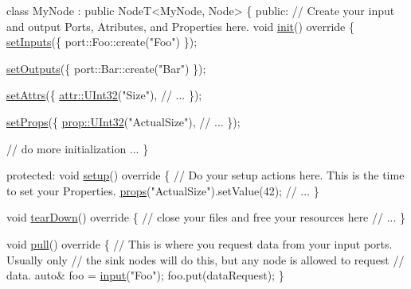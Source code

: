 \begin{DoxyCode}
\textcolor{keyword}{class }MyNode : \textcolor{keyword}{public} NodeT<MyNode, Node>
\{
\textcolor{keyword}{public}:
    \textcolor{comment}{// Create your input and output Ports, Atributes, and Properties here.}
    \textcolor{keywordtype}{void} \hyperlink{classdg_1_1deepcore_1_1_object_a0982aef61087daaf910acfe8b6dcac99}{init}()\textcolor{keyword}{ override}
\textcolor{keyword}{    }\{
        \hyperlink{classdg_1_1deepcore_1_1_node_a23edc019ecfa40357fddf55861ec2092}{setInputs}(\{
            port::Foo::create(\textcolor{stringliteral}{"Foo"})
        \});

        \hyperlink{classdg_1_1deepcore_1_1_node_aac67a930b471ada2d1038965a59f17f3}{setOutputs}(\{
            port::Bar::create(\textcolor{stringliteral}{"Bar"})
        \});

        \hyperlink{classdg_1_1deepcore_1_1_node_a9fedbd6a255711fe28efd9c9ac80374c}{setAttrs}(\{
            \hyperlink{group___process_attributes_ga685518764bcfc2ffb146ef7eb5882b3b}{attr::UInt32}(\textcolor{stringliteral}{"Size"}),
            \textcolor{comment}{// ...}
        \});

        \hyperlink{classdg_1_1deepcore_1_1_node_a51eecd22edf086dd1ab03af684f91c0d}{setProps}(\{
            \hyperlink{group___process_properties_gaf4b72b7a32150a9db0aa1ce09139aa15}{prop::UInt32}(\textcolor{stringliteral}{"ActualSize"}),
            \textcolor{comment}{// ...}
        \});

        \textcolor{comment}{// do more initialization ...}
    \}

\textcolor{keyword}{protected}:
    \textcolor{keywordtype}{void} \hyperlink{classdg_1_1deepcore_1_1_node_a2efcf271a58556b5d1e961795885facb}{setup}()\textcolor{keyword}{ override}
\textcolor{keyword}{    }\{
        \textcolor{comment}{// Do your setup actions here. This is the time to set your Properties.}
        \hyperlink{classdg_1_1deepcore_1_1_node_a24db8fed9656e8dab99eaa0c1f02e3cb}{props}(\textcolor{stringliteral}{"ActualSize"}).setValue(42);
        \textcolor{comment}{// ...}
    \}

    \textcolor{keywordtype}{void} \hyperlink{classdg_1_1deepcore_1_1_node_ab602547ac51ca40c06b0c3d4073bb1f4}{tearDown}()\textcolor{keyword}{ override}
\textcolor{keyword}{    }\{
        \textcolor{comment}{// close your files and free your resources here}
        \textcolor{comment}{// ...}
    \}

    \textcolor{keywordtype}{void} \hyperlink{classdg_1_1deepcore_1_1_node_a3b0d2e8c397f3d039dea77b8c7fdf53e}{pull}()\textcolor{keyword}{ override}
\textcolor{keyword}{    }\{
        \textcolor{comment}{// This is where you request data from your input ports. Usually only}
        \textcolor{comment}{// the sink nodes will do this, but any node is allowed to request}
        \textcolor{comment}{// data.}
        \textcolor{keyword}{auto}& foo = \hyperlink{classdg_1_1deepcore_1_1_node_ab989e614ca802698356be8a5d46faa49}{input}(\textcolor{stringliteral}{"Foo"});
        foo.put(dataRequest);
    \}


\end{DoxyCode}
